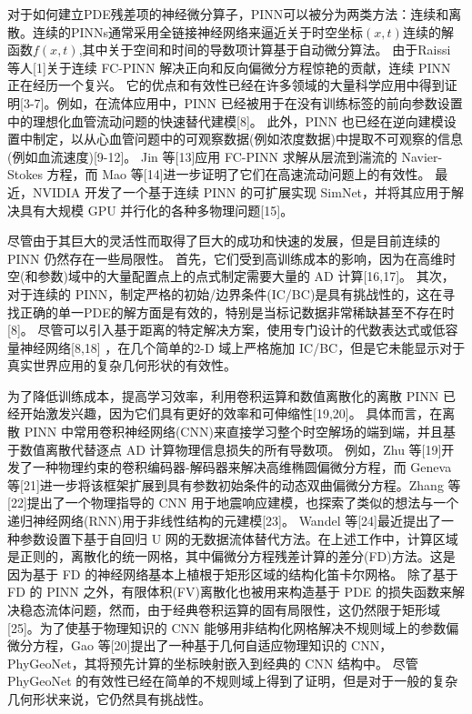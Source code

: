 对于如何建立PDE残差项的神经微分算子，PINN可以被分为两类方法：连续和离散。连续的PINNs通常采用全链接神经网络来逼近关于时空坐标$(x,t)$连续的解函数$f(x,t)$,其中关于空间和时间的导数项计算基于自动微分算法。
由于Raissi 等人[1]关于连续 FC-PINN 解决正向和反向偏微分方程惊艳的贡献，连续 PINN 正在经历一个复兴。
它的优点和有效性已经在许多领域的大量科学应用中得到证明[3-7]。例如，在流体应用中，PINN 已经被用于在没有训练标签的前向参数设置中的理想化血管流动问题的快速替代建模[8]。
此外，PINN 也已经在逆向建模设置中制定，以从心血管问题中的可观察数据(例如浓度数据)中提取不可观察的信息(例如血流速度)[9-12]。
Jin 等[13]应用 FC-PINN 求解从层流到湍流的 Navier-Stokes 方程，而 Mao 等[14]进一步证明了它们在高速流动问题上的有效性。
最近，NVIDIA 开发了一个基于连续 PINN 的可扩展实现 SimNet，并将其应用于解决具有大规模 GPU 并行化的各种多物理问题[15]。

尽管由于其巨大的灵活性而取得了巨大的成功和快速的发展，但是目前连续的 PINN 仍然存在一些局限性。
首先，它们受到高训练成本的影响，因为在高维时空(和参数)域中的大量配置点上的点式制定需要大量的 AD 计算[16,17]。
其次，对于连续的 PINN，制定严格的初始/边界条件(IC/BC)是具有挑战性的，这在寻找正确的单一PDE的解方面是有效的，特别是当标记数据非常稀缺甚至不存在时[8]。
尽管可以引入基于距离的特定解决方案，使用专门设计的代数表达式或低容量神经网络[8,18] ，在几个简单的2-D 域上严格施加 IC/BC，但是它未能显示对于真实世界应用的复杂几何形状的有效性。


为了降低训练成本，提高学习效率，利用卷积运算和数值离散化的离散 PINN 已经开始激发兴趣，因为它们具有更好的效率和可伸缩性[19,20]。
具体而言，在离散 PINN 中常用卷积神经网络(CNN)来直接学习整个时空解场的端到端，并且基于数值离散代替逐点 AD 计算物理信息损失的所有导数项。
例如，Zhu 等[19]开发了一种物理约束的卷积编码器-解码器来解决高维椭圆偏微分方程，而 Geneva 等[21]进一步将该框架扩展到具有参数初始条件的动态双曲偏微分方程。Zhang 等[22]提出了一个物理指导的 CNN 用于地震响应建模，也探索了类似的想法与一个递归神经网络(RNN)用于非线性结构的元建模[23]。
Wandel 等[24]最近提出了一种参数设置下基于自回归 U 网的无数据流体替代方法。在上述工作中，计算区域是正则的，离散化的统一网格，其中偏微分方程残差计算的差分(FD)方法。这是因为基于 FD 的神经网络基本上植根于矩形区域的结构化笛卡尔网格。
除了基于 FD 的 PINN 之外，有限体积(FV)离散化也被用来构造基于 PDE 的损失函数来解决稳态流体问题，然而，由于经典卷积运算的固有局限性，这仍然限于矩形域[25]。为了使基于物理知识的 CNN 能够用非结构化网格解决不规则域上的参数偏微分方程，Gao 等[20]提出了一种基于几何自适应物理知识的 CNN，PhyGeoNet，其将预先计算的坐标映射嵌入到经典的 CNN 结构中。
尽管 PhyGeoNet 的有效性已经在简单的不规则域上得到了证明，但是对于一般的复杂几何形状来说，它仍然具有挑战性。

